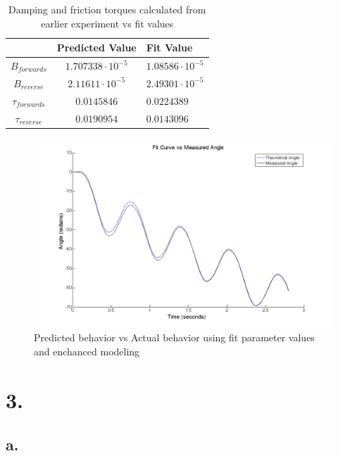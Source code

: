 \documentclass{article}
\theoremstyle{plain}
\theoremstyle{definition}
\theoremstyle{remark}
\begin{document}
\begin{table}
\begin{center}
    \begin{tabular}{|c|c|l|}
        \hline
        ~                 & Predicted Value          & Fit Value               \\ \hline
        $B_{forwards}$    & $1.707338 \cdot 10^{-5}$ & $1.08586 \cdot 10^{-5}$ \\ 
        $B_{reverse}$     & $2.11611 \cdot 10^{-5}$  & $2.49301 \cdot 10^{-5}$ \\ 
        $\tau_{forwards}$ & $0.0145846$              & $0.0224389$             \\ 
        $\tau_{reverse}$  & $0.0190954$              & $0.0143096$             \\
        \hline
    \end{tabular}
\caption{Damping and friction torques calculated from earlier experiment vs fit values}
\label{q2_b9}
\end{center}
\end{table}

\begin{figure}
\begin{center}
\includegraphics[width = 14cm]{awesomefitFiner.png}
\caption{Predicted behavior vs Actual behavior using fit parameter values and enchanced modeling}
\label{q2_b3}
\end{center}
\end{figure}

\section*{3.}
\subsection*{a.}
\end{document}
